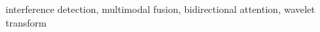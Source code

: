 \documentclass[conference]{IEEEtran}
\begin{document}
\begin{IEEEkeywords}
    interference detection, multimodal fusion, bidirectional attention, wavelet transform
\end{IEEEkeywords}



\end{document}
